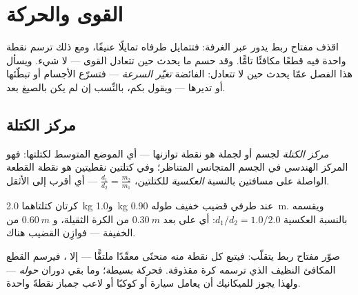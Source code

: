 \chapter{القوى والحركة}\label{ch:g11:forces-and-motion}

اقذف مفتاح ربط يدور عبر الغرفة: فتتمايل طرفاه تمايلًا عنيفًا، ومع ذلك
ترسم نقطة واحدة فيه قطعًا مكافئًا تامًّا. وقد حسم 
ما يحدث حين تتعادل القوى --- لا شيء. ويسأل هذا الفصل
عمّا يحدث حين لا تتعادل:  الفائضة \emph{تغيّر
السرعة} --- فتسرّع الأجسام أو تبطّئها أو تديرها ---
ويقول بكم، بالنِّسب إن لم يكن بالصيغ بعد.

\section{مركز الكتلة}

\begin{definition}\label{def:g11:forces-and-motion:com}
\emph{مركز الكتلة} لجسم أو لجملة هو
نقطة توازنها --- أي الموضع المتوسط لكتلتها: فهو المركز
الهندسي في الجسم المتجانس المتناظر؛ وفي كتلتين نقطيتين هو نقطة
القطعة الواصلة على مسافتين بالنسبة \emph{العكسية} للكتلتين،
$\frac{d_1}{d_2} = \frac{m_2}{m_1}$ --- أي أقرب إلى الأثقل.
\end{definition}

\begin{example}\label{ex:g11:forces-and-motion:dumbbell}
كرتان كتلتاهما \qty{2.0}{kg} و\qty{1.0}{kg} عند طرفي قضيب خفيف
طوله \qty{0.90}{m}. ويقسمه  بالنسبة العكسية
$d_1/d_2 = 1.0/2.0$: أي على بعد $\qty{0.30}{m}$ من الكرة الثقيلة، و
$\qty{0.60}{m}$ من الخفيفة --- فوازِن القضيب هناك.
\end{example}

\begin{remark}\label{rem:g11:forces-and-motion:wrench}
صوّر مفتاح ربط يتقلّب: فيتبع كل نقطة منه منحنًى معقّدًا ملتفًّا
--- إلا ، فيرسم القطع المكافئ النظيف الذي ترسمه كرة
مقذوفة. فحركة  بسيطة؛ وما بقي دوران
\emph{حوله} --- ولهذا يجوز للميكانيك أن يعامل سيارة أو كوكبًا أو
لاعب جمباز نقطةً واحدة.
\end{remark}

